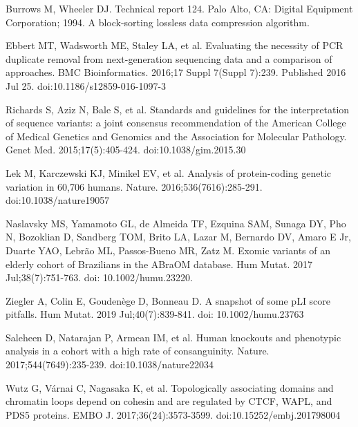 \documentclass[a4paper,12pt]{article}
\begin{document}
\begin{thebibliography}{100}
Burrows M, Wheeler DJ. Technical report 124. Palo Alto, CA: Digital Equipment Corporation; 1994. A block-sorting lossless data compression algorithm.

Ebbert MT, Wadsworth ME, Staley LA, et al. Evaluating the necessity of PCR duplicate removal from next-generation sequencing data and a comparison of approaches. BMC Bioinformatics. 2016;17 Suppl 7(Suppl 7):239. Published 2016 Jul 25. doi:10.1186/s12859-016-1097-3

Richards S, Aziz N, Bale S, et al. Standards and guidelines for the interpretation of sequence variants: a joint consensus recommendation of the American College of Medical Genetics and Genomics and the Association for Molecular Pathology. Genet Med. 2015;17(5):405-424. doi:10.1038/gim.2015.30

Lek M, Karczewski KJ, Minikel EV, et al. Analysis of protein-coding genetic variation in 60,706 humans. Nature. 2016;536(7616):285-291. doi:10.1038/nature19057

Naslavsky MS, Yamamoto GL, de Almeida TF, Ezquina SAM, Sunaga DY, Pho N, Bozoklian D, Sandberg TOM, Brito LA, Lazar M, Bernardo DV, Amaro E Jr, Duarte YAO, Lebrão ML, Passos-Bueno MR, Zatz M. Exomic variants of an elderly cohort of Brazilians in the ABraOM database. Hum Mutat. 2017 Jul;38(7):751-763. doi: 10.1002/humu.23220.

Ziegler A, Colin E, Goudenège D, Bonneau D. A snapshot of some pLI score pitfalls. Hum Mutat. 2019 Jul;40(7):839-841. doi: 10.1002/humu.23763

Saleheen D, Natarajan P, Armean IM, et al. Human knockouts and phenotypic analysis in a cohort with a high rate of consanguinity. Nature. 2017;544(7649):235-239. doi:10.1038/nature22034

Wutz G, Várnai C, Nagasaka K, et al. Topologically associating domains and chromatin loops depend on cohesin and are regulated by CTCF, WAPL, and PDS5 proteins. EMBO J. 2017;36(24):3573-3599. doi:10.15252/embj.201798004
\end{thebibliography}
\end{document}
